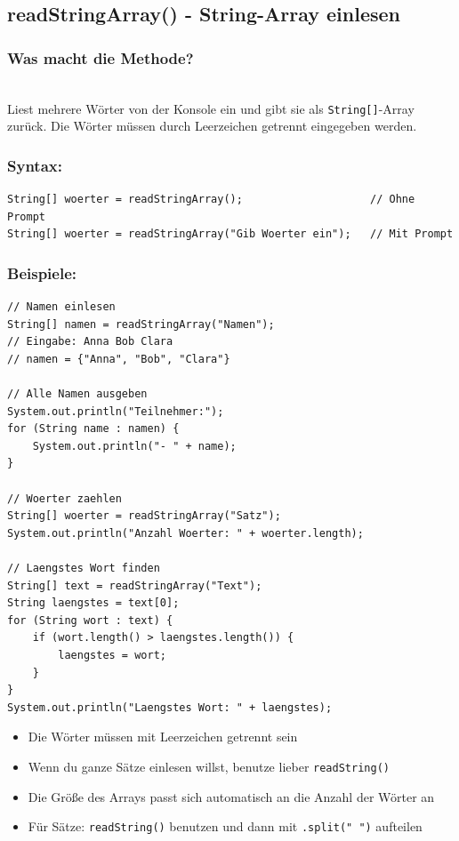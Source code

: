 \newpage


\subsection*{readStringArray() - String-Array einlesen}

\subsubsection*{Was macht die Methode?}\\
Liest mehrere Wörter von der Konsole ein und gibt sie als \texttt{String[]}-Array zurück.
Die Wörter müssen durch Leerzeichen getrennt eingegeben werden.

\subsubsection*{Syntax:}
\begin{lstlisting}
String[] woerter = readStringArray();                    // Ohne Prompt
String[] woerter = readStringArray("Gib Woerter ein");   // Mit Prompt
\end{lstlisting}

\subsubsection*{Beispiele:}
\begin{lstlisting}
// Namen einlesen
String[] namen = readStringArray("Namen");
// Eingabe: Anna Bob Clara
// namen = {"Anna", "Bob", "Clara"}

// Alle Namen ausgeben
System.out.println("Teilnehmer:");
for (String name : namen) {
    System.out.println("- " + name);
}

// Woerter zaehlen
String[] woerter = readStringArray("Satz");
System.out.println("Anzahl Woerter: " + woerter.length);

// Laengstes Wort finden
String[] text = readStringArray("Text");
String laengstes = text[0];
for (String wort : text) {
    if (wort.length() > laengstes.length()) {
        laengstes = wort;
    }
}
System.out.println("Laengstes Wort: " + laengstes);
\end{lstlisting}

\begin{achtung}
	\begin{itemize}
		\item Die Wörter müssen mit Leerzeichen getrennt sein
		\item Wenn du ganze Sätze einlesen willst, benutze lieber \texttt{readString()}
		\item Die Größe des Arrays passt sich automatisch an die Anzahl der Wörter an
		\item Für Sätze: \texttt{readString()} benutzen und dann mit \texttt{.split(" ")} aufteilen
	\end{itemize}
\end{achtung}

